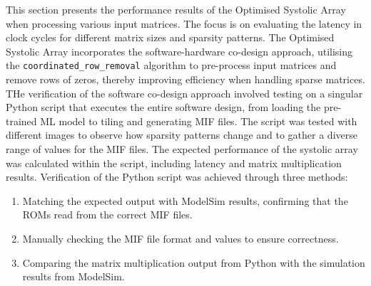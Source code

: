 \documentclass[12pt, a4paper, ukenglish]{article}
\begin{document}

    

    This section presents the performance results of the Optimised Systolic Array when processing various input matrices. The focus is on evaluating the latency in clock cycles for different matrix sizes and sparsity patterns. The Optimised Systolic Array incorporates the software-hardware co-design approach, utilising the \texttt{coordinated\_row\_removal} algorithm to pre-process input matrices and remove rows of zeros, thereby improving efficiency when handling sparse matrices.
    \newline
    THe verification of the software co-design approach involved testing on a singular Python script that executes the entire software design, from loading the pre-trained ML model to tiling and generating MIF files. The script was tested with different images to observe how sparsity patterns change and to gather a diverse range of values for the MIF files. The expected performance of the systolic array was calculated within the script, including latency and matrix multiplication results. Verification of the Python script was achieved through three methods: 
    \begin{enumerate}
        \item Matching the expected output with ModelSim results, confirming that the ROMs read from the correct MIF files.
        \item Manually checking the MIF file format and values to ensure correctness.
        \item Comparing the matrix multiplication output from Python with the simulation results from ModelSim.
    \end{enumerate}
\end{document}

